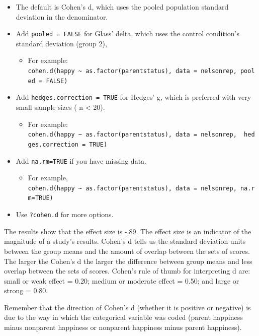 \documentclass[
]{book}
\providecommand{\tightlist}{%
  \setlength{\itemsep}{0pt}\setlength{\parskip}{0pt}}
\begin{document}
\begin{itemize}
\tightlist
\item
  The default is Cohen's d, which uses the pooled population standard deviation in the denominator.\\
\item
  Add \texttt{pooled\ =\ FALSE} for Glass' delta, which uses the control condition's standard deviation (group 2),

  \begin{itemize}
  \tightlist
  \item
    For example: \texttt{cohen.d(happy\ \textasciitilde{}\ as.factor(parentstatus),\ data\ =\ nelsonrep,\ pooled\ =\ FALSE)}
  \end{itemize}
\item
  Add \texttt{hedges.correction\ =\ TRUE} for Hedges' g, which is preferred with very small sample sizes ( n \textless{} 20).

  \begin{itemize}
  \tightlist
  \item
    For example: \texttt{cohen.d(happy\ \textasciitilde{}\ as.factor(parentstatus),\ data\ =\ nelsonrep,\ \ hedges.correction\ =\ TRUE)}
  \end{itemize}
\item
  Add \texttt{na.rm=TRUE} if you have missing data.

  \begin{itemize}
  \tightlist
  \item
    For example, \texttt{cohen.d(happy\ \textasciitilde{}\ as.factor(parentstatus),\ data\ =\ nelsonrep,\ na.rm=TRUE)}
  \end{itemize}
\item
  Use \texttt{?cohen.d} for more options.
\end{itemize}

The results show that the effect size is -.89. The effect size is an indicator of the magnitude of a study's results. Cohen's d tells us the standard deviation units between the group means and the amount of overlap between the sets of scores. The larger the Cohen's d the larger the difference between group means and less overlap between the sets of scores. Cohen's rule of thumb for interpreting d are: small or weak effect = 0.20; medium or moderate effect = 0.50; and large or strong = 0.80.

Remember that the direction of Cohen's d (whether it is positive or negative) is due to the way in which the categorical variable was coded (parent happiness minus nonparent happiness or nonparent happiness minus parent happiness).
\end{document}
